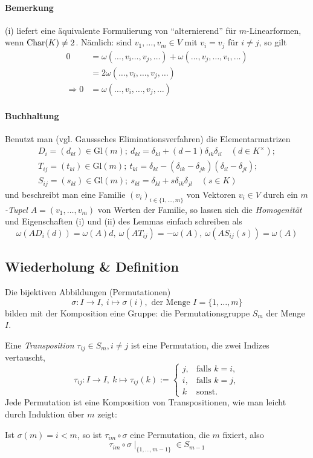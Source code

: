  	\paragraph{Bemerkung}
 		(i) liefert eine äquivalente Formulierung von "`alternierend"' für $ m $-Linearformen, wenn $ \operatorname{Char} (K)\neq 2 $.
 		Nämlich: sind $ v_1,\dots,v_m\in V $ mit $ v_i=v_j $ für $ i\neq j $, so gilt
 		\begin{align*}
 			0             & = \omega(\dots,v_i\dots,v_j,\dots)+\omega(\dots,v_j,\dots,v_i,\dots) \\
 			              & = 2\omega(\dots,v_i,\dots,v_j,\dots)                                 \\
 			\Rightarrow 0 & = \omega(\dots,v_i,\dots,v_j,\dots)
 		\end{align*}
 	\paragraph{Buchhaltung}
 		Benutzt man (vgl. Gausssches Eliminationsverfahren) die Elementarmatrizen
 		\begin{gather*}
 			D_i = (d_{kl}) \in \mathrm{Gl}(m);\ d_{kl} = \delta_{kl}+(d-1)\delta_{ik}\delta_{il}\quad (d\in K^\times);\\
 			T_{ij} = (t_{kl}) \in \mathrm{Gl}(m);\ t_{kl} = \delta_{kl}-(\delta_{ik}-\delta_{jk})(\delta_{il}-\delta_{jl});\\
 			S_{ij} = (s_{kl})\in \mathrm{Gl}(m);\ s_{kl}=\delta_{kl}+s\delta_{ik}\delta_{jl}\quad (s\in K)
 		\end{gather*}
 		und beschreibt man eine Familie $ (v_i)_{i\in \{1,\dots,m\}} $ von Vektoren $ v_i\in V $ durch ein \emph{$ m $-Tupel} $ A=(v_1,\dots,v_m) $ von Werten der Familie, so lassen sich die \emph{Homogenität} und Eigenschaften (i) und (ii) des Lemmas einfach schreiben als
 		\[
 			\omega(AD_i(d)) = \omega(A)d,\ \omega(AT_{ij}) = -\omega(A),\ \omega(AS_{ij}(s)) = \omega(A)
 		\]
 \subsection{Wiederholung \& Definition}
 	Die bijektiven Abbildungen (Permutationen)
 	\[
 		\sigma: I\to I,\ i\mapsto \sigma(i),\text{ der Menge }I = \{1,\dots,m\}
 	\]
 	bilden mit der Komposition eine Gruppe: die Permutationsgruppe $ S_m $ der Menge $ I $.
 	\begin{Definition}[Transposition]
 		Eine \emph{Transposition} $ \tau_{ij} \in S_m, i\neq j $ ist eine Permutation, die zwei Indizes vertauscht,
 		\[
 			\tau_{ij}:I\to I,\ k\mapsto \tau_{ij}(k):=
 			\begin{cases}
 				j, & \text{falls } k=i, \\
 				i, & \text{falls } k=j, \\
 				k  & \text{sonst}.
 			\end{cases}
 		\]
 		Jede Permutation ist eine Komposition von Transpositionen, wie man leicht durch Induktion über $m$ zeigt:

 		Ist $ \sigma(m) = i<m$, so ist $ \tau_{im}\circ \sigma $ eine Permutation, die $ m $ fixiert, also
 		\[
 			\tau_{im}\circ\sigma\mid_{\{1,\dots,m-1\}}\in S_{m-1}
 		\]
 	\end{Definition}
